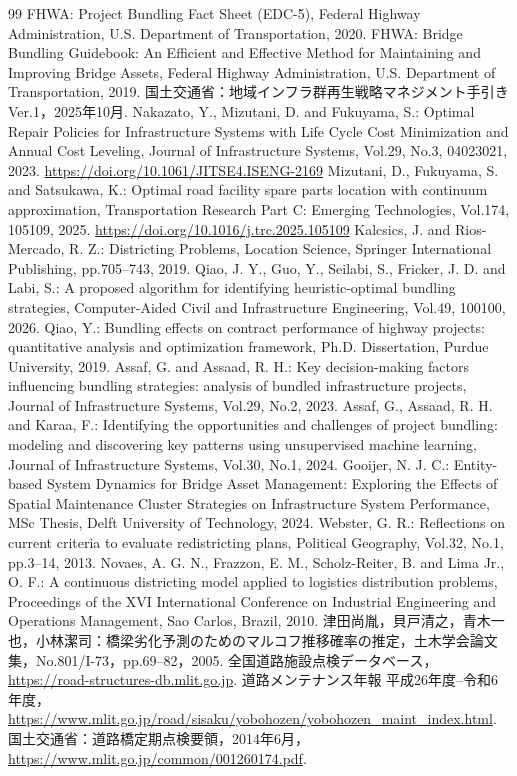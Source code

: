 \documentclass[Journal,letterpaper,InsideFigs,NoLineNumbers]{ascelike-new}
\begin{document}
\begin{thebibliography}{99}
FHWA: Project Bundling Fact Sheet (EDC-5), Federal Highway Administration, U.S. Department of Transportation, 2020.
FHWA: Bridge Bundling Guidebook: An Efficient and Effective Method for Maintaining and Improving Bridge Assets, Federal Highway Administration, U.S. Department of Transportation, 2019.
国土交通省：地域インフラ群再生戦略マネジメント手引き Ver.1，2025年10月.
Nakazato, Y., Mizutani, D. and Fukuyama, S.: Optimal Repair Policies for Infrastructure Systems with Life Cycle Cost Minimization and Annual Cost Leveling, Journal of Infrastructure Systems, Vol.29, No.3, 04023021, 2023. \url{https://doi.org/10.1061/JITSE4.ISENG-2169}
Mizutani, D., Fukuyama, S. and Satsukawa, K.: Optimal road facility spare parts location with continuum approximation, Transportation Research Part C: Emerging Technologies, Vol.174, 105109, 2025. \url{https://doi.org/10.1016/j.trc.2025.105109}
Kalcsics, J. and Rios-Mercado, R. Z.: Districting Problems, Location Science, Springer International Publishing, pp.705--743, 2019.
Qiao, J. Y., Guo, Y., Seilabi, S., Fricker, J. D. and Labi, S.: A proposed algorithm for identifying heuristic-optimal bundling strategies, Computer-Aided Civil and Infrastructure Engineering, Vol.49, 100100, 2026.
Qiao, Y.: Bundling effects on contract performance of highway projects: quantitative analysis and optimization framework, Ph.D. Dissertation, Purdue University, 2019.
Assaf, G. and Assaad, R. H.: Key decision-making factors influencing bundling strategies: analysis of bundled infrastructure projects, Journal of Infrastructure Systems, Vol.29, No.2, 2023.
Assaf, G., Assaad, R. H. and Karaa, F.: Identifying the opportunities and challenges of project bundling: modeling and discovering key patterns using unsupervised machine learning, Journal of Infrastructure Systems, Vol.30, No.1, 2024.
Gooijer, N. J. C.: Entity-based System Dynamics for Bridge Asset Management: Exploring the Effects of Spatial Maintenance Cluster Strategies on Infrastructure System Performance, MSc Thesis, Delft University of Technology, 2024.
Webster, G. R.: Reflections on current criteria to evaluate redistricting plans, Political Geography, Vol.32, No.1, pp.3--14, 2013.
Novaes, A. G. N., Frazzon, E. M., Scholz-Reiter, B. and Lima Jr., O. F.: A continuous districting model applied to logistics distribution problems, Proceedings of the XVI International Conference on Industrial Engineering and Operations Management, Sao Carlos, Brazil, 2010.
津田尚胤，貝戸清之，青木一也，小林潔司：橋梁劣化予測のためのマルコフ推移確率の推定，土木学会論文集，No.801/I-73，pp.69--82，2005.
全国道路施設点検データベース，\url{https://road-structures-db.mlit.go.jp}.
道路メンテナンス年報 平成26年度--令和6年度，\url{https://www.mlit.go.jp/road/sisaku/yobohozen/yobohozen_maint_index.html}.
国土交通省：道路橋定期点検要領，2014年6月，\url{https://www.mlit.go.jp/common/001260174.pdf}.
\end{thebibliography}
\end{document}
